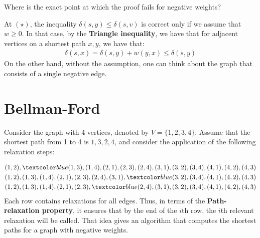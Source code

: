   \begin{exercise}
Where is the exact point at which the proof fails for negative weights?
  \end{exercise}
  \begin{solution}
At $(\star)$, the inequality $\delta(s,y) \le \delta(s,v)$ is correct only if we assume that $w \ge 0$. In that case, by the \textbf{Triangle inequality}, we have that for adjacent vertices on a shortest path $x, y$, we have that:
    \begin{equation*}
      \begin{split}
        \delta(s,x) = \delta(s,y) + w(y,x) \le \delta(s,y)
      \end{split}
    \end{equation*}
On the other hand, without the assumption, one can think about the graph that consists of a single negative edge.
  \end{solution}


  \section{Bellman-Ford}
  
Consider the graph with 4 vertices, denoted by \( V = \{1, 2, 3, 4\} \). Assume that the shortest path from 1 to 4 is \( 1, 3, 2, 4 \), and consider the application of the following relaxation steps:

  \begin{equation*}
    \begin{split}
      & (1,2),\inb{(1,3)},(1,4),(2,1),(2,3),(2,4),(3,1),(3,2),(3,4),(4,1),(4,2),(4,3)\\
      & (1,2),(1,3),(1,4),(2,1),(2,3),(2,4),(3,1),\inb{(3,2)},(3,4),(4,1),(4,2),(4,3)\\
      & (1,2),(1,3),(1,4),(2,1),(2,3),\inb{(2,4)},(3,1),(3,2),(3,4),(4,1),(4,2),(4,3)
    \end{split}
  \end{equation*}
  Each row contains relaxations for all edges. Thus, in terms of the \textbf{Path-relaxation property}, it ensures that by the end of the $i$th row, the $i$th relevant relaxation will be called. That idea gives an algorithm that computes the shortest paths for a graph with negative weights.


